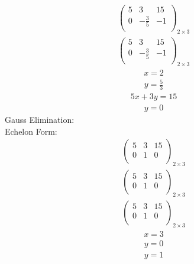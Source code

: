 \documentclass{article}
\begin{document}
\begin{align*}
\left(
\begin{array}{cc|c}
5 & 3 & 15\\
0 & -\frac{3}{5} & -1\\
\end{array}
\right)_{2\times 3}
\end{align*}
\begin{align*}
\left(
\begin{array}{cc|c}
5 & 3 & 15\\
0 & -\frac{3}{5} & -1\\
\end{array}
\right)_{2\times 3}
\end{align*}
\begin{align*}
x=2\end{align*}
\begin{align*}
y=\frac{5}{3}\end{align*}
\begin{align*}
5x + 3y=15\end{align*}
\begin{align*}
y=0\end{align*}
Gauss Elimination:\\
Echelon Form:\\
\begin{align*}
\left(
\begin{array}{cc|c}
5 & 3 & 15\\
0 & 1 & 0\\
\end{array}
\right)_{2\times 3}
\end{align*}
\begin{align*}
\left(
\begin{array}{cc|c}
5 & 3 & 15\\
0 & 1 & 0\\
\end{array}
\right)_{2\times 3}
\end{align*}
\begin{align*}
\left(
\begin{array}{cc|c}
5 & 3 & 15\\
0 & 1 & 0\\
\end{array}
\right)_{2\times 3}
\end{align*}
\begin{align*}
x=3\end{align*}
\begin{align*}
y=0\end{align*}
\begin{align*}
y=1\end{align*}
\end{document}
